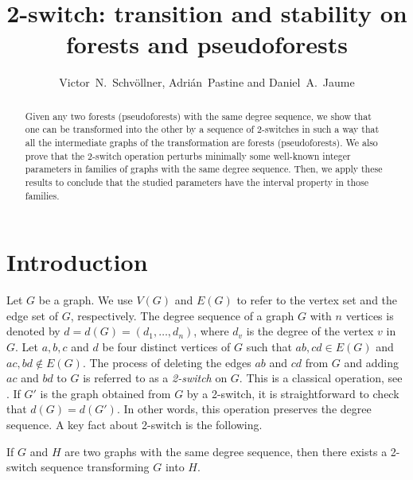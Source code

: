 \documentclass{BICA}
\title{2-switch: transition and stability on forests and pseudoforests}
\author{%
Victor~N.~Schv\"ollner,
Adri\'an~Pastine
and
Daniel~A.~Jaume
}
\begin{document}
\maketitle




\begin{abstract}
Given any two forests (pseudoforests) with the same degree sequence, we show that one can be transformed into the other by a sequence of 2-switches in such a way that all the intermediate graphs of the transformation are forests (pseudoforests). We also prove that the 2-switch operation perturbs minimally some well-known integer parameters in families of graphs with the same degree sequence. Then, we apply these results to conclude that the studied parameters have the interval property in those families.
\end{abstract}


\section{Introduction}

Let $G$ be a graph. We use $V(G)$ and $E(G)$ to refer to the vertex set and the edge set of $G$, respectively. The degree sequence of a graph $G$ with $n$ vertices is denoted by $d=d(G)=(d_1,\ldots,d_n)$, where $d_v$ is the degree of the vertex $v$ in $G$. Let $a,b,c$ and $d$ be four distinct vertices of $G$ such that $ab,cd\in E(G)$ and $ac,bd\notin E(G)$. The process of deleting the edges $ab$ and $cd$ from $G$ and adding $ac$ and $bd$ to $G$ is referred to as a \emph{2-switch} on $G$. This is a classical operation, see \cite{Berge, Chartrand1996}. If $G'$ is the graph obtained from $G$ by a 2-switch, it is straightforward to check that $d(G)=d(G')$. In other words, this operation preserves the degree sequence. A key fact about 2-switch is the following.

\begin{theorem}\label{BergeTeo}
	If $G$ and $H$ are two graphs with the same degree sequence, then there exists a 2-switch sequence transforming $G$ into $H$.
\end{theorem}
\end{document}
